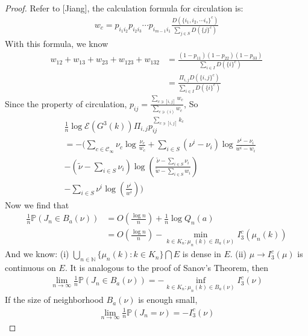 \documentclass[11pt,en,cite=authoryear]{elegantpaper}
\begin{document}
\begin{proof}
    Refer to [Jiang], the calculation formula
    for circulation is:
    \begin{align*}
        w_c = p_{i_1 i_2} p_{i_2 i_3} \cdots p_{i_{m-1} i_1} \frac{D(\{i_1, i_2, \cdots i_s\}^c)}{\sum_{j\in S} D(\{j\}^c)}
    \end{align*}
    With this formula, we know
    \begin{align*}
        w_{12}+w_{13}+w_{23}+w_{123}+w_{132} &= \frac{(1-p_{11})(1-p_{22})(1-p_{33})}{\sum_{i\in I} D(\{i\}^c)} \\
        &= \frac{\Pi_{i, j} D(\{i, j\}^c)}{\sum_{i\in I} D(\{i\}^c)}
    \end{align*}
    Since the property of circulation, $p_{ij} = \frac{\sum_{c \ni [i,j]} w_c}{\sum_{c \ni (i)} w_c}$, So
    \begin{align*}
        &\frac{1}{n} \log \mathcal{E} (G^3(k)) \Pi_{i, j} p_{ij}^{\sum_{c \ni [i,j]} k_{c}} \\
        &= -\bigl(\sum_{c \in \mathcal{C}_{\infty}} \nu_{c} \log \frac{\nu_{c}}{w_c} + \sum_{i\in S}(\nu^i - \nu_i)\log \frac{\nu^i - \nu_i}{w^i - w_i} \\
        &-(\tilde{\nu} - \sum_{i\in S}\nu_i)\log(\frac{\tilde{\nu} - \sum_{i\in S}\nu_i}{\tilde{w} - \sum_{i\in S}w_i}) \\
        &-\sum_{i\in S} \nu^i \log (\frac{\nu^i}{w^i}) \bigr)
    \end{align*}
    Now we find that
    \begin{align*}
        \frac{1}{n} \mathbb{P}(J_n \in B_a(\nu))
        &= O(\frac{\log n}{n}) + \frac{1}{n} \log Q_n(a) \\
        &= O(\frac{\log n}{n}) - \min_{k \in K_n: \mu_n(k) \in B_a(\nu)} I_3^c(\mu_n(k))
    \end{align*}
    And we know:
    (i) $\bigcup_{n\in \mathbb{N}} \{\mu_n(k): k \in K_n\} \bigcap E$ is dense in $E$.
    (ii) $\mu \rightarrow I_3^c(\mu)$ is continuous on $E$.
    It is analogous to the proof of Sanov's Theorem, then
    \begin{align*}
        \lim_{n \rightarrow \infty} \frac{1}{n} \mathbb{P}(J_n \in B_a(\nu)) 
        = -\inf_{k \in K_n: \mu_n(k) \in B_a(\nu)} I_3^c(\nu)
    \end{align*}
    If the size of neighborhood $B_a(\nu)$ is enough small, 
    \begin{align*}
        \lim_{n \rightarrow \infty} \frac{1}{n} \mathbb{P}(J_n = \nu) 
        = - I_3^c(\nu)
    \end{align*}
\end{proof}
\end{document}
